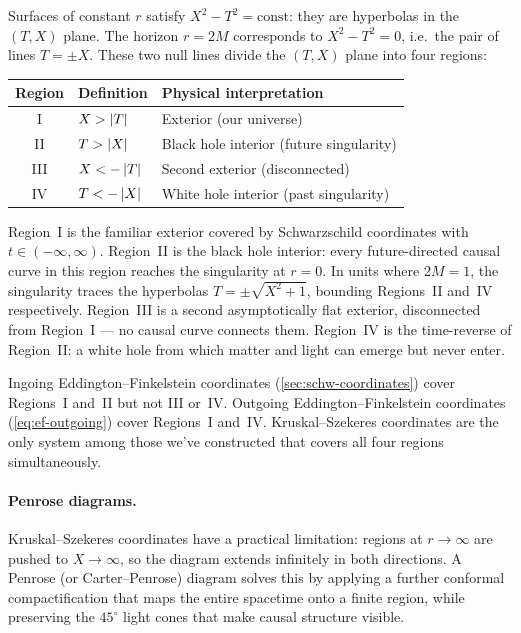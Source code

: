 Surfaces of constant $r$ satisfy $X^2 - T^2 = \text{const}$:
they are hyperbolas in the $(T, X)$ plane.  The horizon $r = 2M$
corresponds to $X^2 - T^2 = 0$, i.e.\ the pair of lines
$T = \pm X$.  These two null lines divide the $(T, X)$ plane into
four regions:
%
\begin{center}
\begin{tabular}{cll}
  \toprule
  Region & Definition & Physical interpretation \\
  \midrule
  I   & $X > \left\lvert T \right\rvert$ & Exterior (our universe) \\
  II  & $T > \left\lvert X \right\rvert$ & Black hole interior (future singularity) \\
  III & $X < -\left\lvert T \right\rvert$ & Second exterior (disconnected) \\
  IV  & $T < -\left\lvert X \right\rvert$ & White hole interior (past singularity) \\
  \bottomrule
\end{tabular}
\end{center}
%
Region~I is the familiar exterior covered by Schwarzschild coordinates
with $t \in (-\infty, \infty)$.  Region~II is the black hole interior:
every future-directed causal curve in this region reaches the
singularity at $r = 0$.  In units where $2M = 1$, the singularity
traces the hyperbolas $T = \pm\sqrt{X^2 + 1}$, bounding Regions~II
and~IV respectively.  Region~III is a second asymptotically flat
exterior,
disconnected from Region~I --- no causal curve connects them.
Region~IV is the time-reverse of Region~II: a white hole from which
matter and light can emerge but never enter.

Ingoing Eddington--Finkelstein coordinates
(\cref{sec:schw-coordinates}) cover Regions~I and~II but not III
or~IV.  Outgoing Eddington--Finkelstein coordinates
(\cref{eq:ef-outgoing}) cover Regions~I and~IV.
Kruskal--Szekeres coordinates are the only system among those
we've constructed that covers all four regions simultaneously.

\paragraph{Penrose diagrams.}

Kruskal--Szekeres coordinates have a practical limitation: regions at
$r \to \infty$ are pushed to $X \to \infty$, so the diagram extends
infinitely in both directions.  A Penrose (or Carter--Penrose) diagram
solves this by applying a further conformal compactification that maps
the entire spacetime onto a finite region, while preserving the
$45^\circ$ light cones that make causal structure visible.

